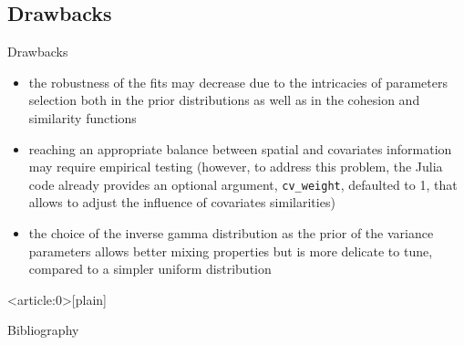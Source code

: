 \documentclass[
	11pt, %
 xcolor={dvipsnames,svgnames}
]{beamer}
\newcommand{\mjline}[1]{\texttt{#1}}
\begin{document}
\subsection{Drawbacks}
\begin{frame}{Drawbacks}
\begin{itemize}
    \item the robustness of the fits may decrease due to the intricacies of parameters selection both in the prior distributions as well as in the cohesion and similarity functions
    \item reaching an appropriate balance between spatial and covariates information may require empirical testing (however, to address this problem, the Julia code already provides an optional argument, \mjline{cv_weight}, defaulted to 1, that allows to adjust the influence of covariates similarities)
    \item the choice of the inverse gamma distribution as the prior of the variance parameters allows better mixing properties but is more delicate to tune, compared to a simpler uniform distribution
\end{itemize}
\end{frame}


{ %
    \begin{frame}<article:0>[plain]
     \end{frame}
}


\begin{frame}[allowframebreaks]{Bibliography}
 \printbibliography
\end{frame}

%  
%  
\end{document}
